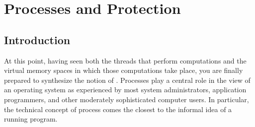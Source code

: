 \chapter{Processes and Protection}\label{processes-chapter}

\section{Introduction}

At this point, having seen both the threads that perform computations
and the virtual memory spaces in which those computations take place,
you are finally prepared to synthesize the notion of .  Processes
play a central role in the view of an operating system as experienced
by most system administrators, application programmers, and other
moderately sophisticated computer users.  In particular, the technical
concept of process comes the closest to the informal idea of a running
program.

